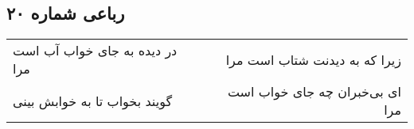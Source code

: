 \begin{center}
\section*{رباعی شماره ۲۰}
\label{sec:sh020}
\begin{longtable}{l p{0.5cm} r}
در دیده به جای خواب آب است مرا
&&
زیرا که به دیدنت شتاب است مرا
\\
گویند بخواب تا به خوابش بینی
&&
ای بی‌خبران چه جای خواب است مرا
\\
\end{longtable}
\end{center}
